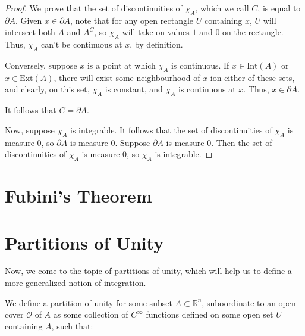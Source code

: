 \documentclass[10pt, oneside]{amsart}
\begin{document}
      \begin{proof}
        We prove that the set of discontinuities of $\chi_A$, which we call $C$, is equal to $\partial A$. Given $x \in \partial A$, note that for any open rectangle $U$ containing $x$, $U$
        will intersect both $A$ and $A^{C}$, so $\chi_A$ will take on values $1$ and $0$ on the rectangle. Thus, $\chi_A$ can't be continuous at $x$, by definition.
        \newline

        Conversely, suppose $x$ is a point at which $\chi_A$ is continuous. If $x \in \text{Int}(A)$ or $x \in \text{Ext}(A)$, there will exist some neighbourhood of $x$ ion either of these sets,
        and clearly, on this set, $\chi_A$ is constant, and $\chi_A$ is continuous at $x$. Thus, $x \in \partial A$.
        \newline

        It follows that $C = \partial A$.
        \newline

        Now, suppose $\chi_A$ is integrable. It follows that the set of discontinuities of $\chi_A$ is measure-$0$, so $\partial A$ is measure-$0$. Suppose $\partial A$ is measure-$0$. Then
        the set of discontinuities of $\chi_A$ is measure-$0$, so $\chi_A$ is integrable.
        \end{proof}

      \hrulefill

      \section{Fubini's Theorem}

      

      \hrulefill

    \section{Partitions of Unity}

    \hrulefill

    Now, we come to the topic of partitions of unity, which will help us to define a more generalized notion of integration.
    \newline

    We define a partition of unity for some subset $A \subset \mathbb{R}^{n}$, suboordinate to an open cover $\mathcal{O}$ of $A$ as some collection
    of $C^{\infty}$ functions defined on some open set $U$ containing $A$, such that:
\end{document}
